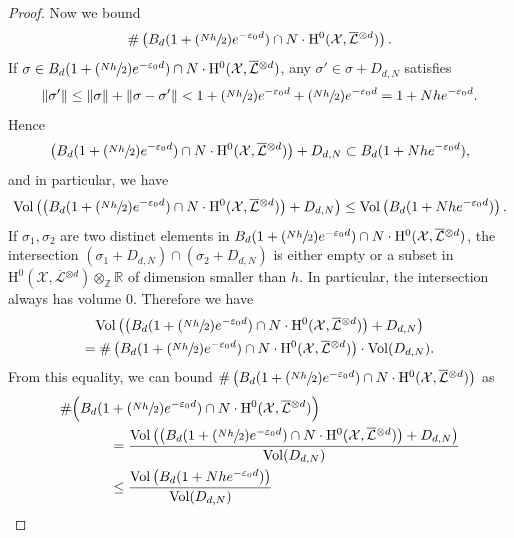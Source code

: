 \documentclass[JEP,XML,SOM,Unicode,published]{cedram}
\newcommand{\Psfrac}[2]{(\sfrac{#1}{#2})}
\theoremstyle{plain}
\theoremstyle{definition}
\newcommand{\ho}{\mathrm{H}}
\newcommand{\X}{\mathcal{X}}
\newcommand{\Li}{\overline{\mathcal{L}}{}}
\begin{document}
\begin{proof}[Proof]
Now we bound
\[
\#\left(B_d(1+\Psfrac{Nh}{2}e^{-\varepsilon_0 d}) \cap N\cdot \ho^0(\X,\Li^{\otimes d}) \right).
\]
If $\sigma\in B_d(1+\Psfrac{Nh}{2}e^{-\varepsilon_0 d}) \cap N\cdot \ho^0(\X,\Li^{\otimes d})$, any $\sigma'\in \sigma+D_{d,N}$ satisfies
\[
\lVert \sigma' \rVert \leq \lVert \sigma\rVert +\lVert \sigma-\sigma'\rVert <1+\Psfrac{Nh}{2}e^{-\varepsilon_0 d}+\Psfrac{Nh}{2}e^{-\varepsilon_0 d}=1+Nhe^{-\varepsilon_0 d}.
\]
Hence
\[
\left(B_d(1+\Psfrac{Nh}{2}e^{-\varepsilon_0 d}) \cap N\cdot \ho^0(\X,\Li^{\otimes d}) \right)+D_{d,N}\subset B_d(1+Nhe^{-\varepsilon_0 d}),
\]
and in particular, we have
\[
\mathrm{Vol}\left(\left(B_d(1+\Psfrac{Nh}{2}e^{-\varepsilon_0 d}) \cap N\cdot \ho^0(\X,\Li^{\otimes d}) \right)+D_{d,N} \right)\leq \mathrm{Vol} \left(B_d(1+Nhe^{-\varepsilon_0 d}) \right).
\]
If $\sigma_1,\sigma_2$ are two distinct elements in $B_d(1+\Psfrac{Nh}{2}e^{-\varepsilon_0 d}) \cap N\cdot \ho^0(\X,\Li^{\otimes d})$, the intersection $(\sigma_1+D_{d,N})\cap (\sigma_2+D_{d,N})$ is either empty or a subset in $\ho^0(\X,\Li^{\otimes d})\otimes_{\mathbb{Z}}\mathbb{R}$ of dimension smaller than $h$. In particular, the intersection always has volume $0$. Therefore we have
\begin{multline*}
\mathrm{Vol}\left(\left(B_d(1+\Psfrac{Nh}{2}e^{-\varepsilon_0 d}) \cap N\cdot \ho^0(\X,\Li^{\otimes d}) \right)+D_{d,N} \right) \\
=\# \left(B_d(1+\Psfrac{Nh}{2}e^{-\varepsilon_0 d}) \cap N\cdot \ho^0(\X,\Li^{\otimes d}) \right)\cdot \mathrm{Vol}(D_{d,N}).
\end{multline*}
From this equality, we can bound $\# \left(B_d(1+\Psfrac{Nh}{2}e^{-\varepsilon_0 d}) \cap N\cdot \ho^0(\X,\Li^{\otimes d}) \right)$ as
\begin{align*}
\# \Bigl(B_d(1&+\Psfrac{Nh}{2}e^{-\varepsilon_0 d}) \cap N\cdot \ho^0(\X,\Li^{\otimes d}) \Bigr)\\
&=\frac{\mathrm{Vol}\left(\left(B_d(1+\Psfrac{Nh}{2}e^{-\varepsilon_0 d}) \cap N\cdot \ho^0(\X,\Li^{\otimes d}) \right)+D_{d,N} \right)}{\mathrm{Vol}(D_{d,N})}\\
&\leq \frac{\mathrm{Vol} \left(B_d(1+Nhe^{-\varepsilon_0 d}) \right)}{\mathrm{Vol}(D_{d,N})}
\end{align*}


\end{proof}
\end{document}
